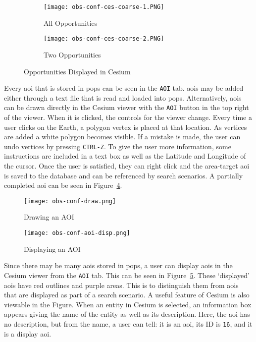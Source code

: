 \begin{figure}
    \centering
    \begin{subfigure}[b]{0.95\textwidth}
	\texttt{[image: obs-conf-ces-coarse-1.PNG]} 
	\caption{All Opportunities}
	\label{fig:obs-conf-ci-1} 
    \end{subfigure}
    \hfill
    \begin{subfigure}[b]{0.95\textwidth}
	\texttt{[image: obs-conf-ces-coarse-2.PNG]} 
	\caption{Two Opportunities}
	\label{fig:obs-conf-ci-2} 
    \end{subfigure}
    \caption{Opportunities Displayed in Cesium}
    \label{fig:obs-conf-ci} 
\end{figure}

Every \gls{aoi} that is stored in \gls{pops} can be seen in the \texttt{AOI}
tab. \glspl{aoi} may be added either through a text file that is read and
loaded into \gls{pops}. Alternatively, \glspl{aoi} can be drawn directly in the
Cesium viewer with the \texttt{AOI} button in the top right of the viewer.
When it is clicked, the controls for the viewer change. Every time a user
clicks on the Earth, a polygon vertex is placed at that location. As vertices
are added a white polygon becomes visible. If a mistake is made, the user can
undo vertices by pressing \texttt{CTRL-Z}. To give the user more information,
some instructions are included in a text box as well as the Latitude and
Longitude of the cursor.  Once the user is satisfied, they can right click and
the area-target \gls{aoi} is saved to the database and can be referenced by
search scenarios. A partially completed \gls{aoi} can be seen in
Figure~\ref{fig:obs-conf-draw}. 

\begin{figure}
    \centering
    \texttt{[image: obs-conf-draw.png]} 
    \caption{Drawing an AOI}
    \label{fig:obs-conf-draw} 
\end{figure}

\begin{figure}
    \centering
    \texttt{[image: obs-conf-aoi-disp.png]} 
    \caption{Displaying an AOI}
    \label{fig:obs-conf-aoi-display} 
\end{figure}

Since there may be many \glspl{aoi} stored in \gls{pops}, a user can display
\glspl{aoi} in the Cesium viewer from the \texttt{AOI} tab. This can be seen in
Figure~\ref{fig:obs-conf-aoi-display}. These `displayed' \glspl{aoi} have red
outlines and purple areas. This is to distinguish them from \glspl{aoi} that
are displayed as part of a search scenario. A useful feature of Cesium is also
viewable in the Figure. When an entity in Cesium is selected, an information
box appears giving the name of the entity as well as its description. Here, the
\gls{aoi} has no description, but from the name, a user can tell: it is an \gls{aoi},
its ID is \texttt{16}, and it is a display \gls{aoi}.



